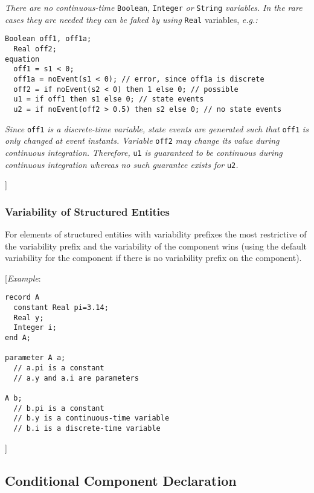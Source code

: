 \emph{There are no continuous-time} \lstinline!Boolean!, \lstinline!Integer! \emph{or} \lstinline!String!
\emph{variables.} \emph{In the rare cases they are needed they can be
faked by using} \lstinline!Real! variables, \emph{e.g.:}
\begin{lstlisting}[language=modelica]
  Boolean off1, off1a;
  Real off2;
equation
  off1 = s1 < 0;
  off1a = noEvent(s1 < 0); // error, since off1a is discrete
  off2 = if noEvent(s2 < 0) then 1 else 0; // possible
  u1 = if off1 then s1 else 0; // state events
  u2 = if noEvent(off2 > 0.5) then s2 else 0; // no state events
\end{lstlisting}

\emph{Since} \lstinline!off1! \emph{is a discrete-time variable, state events are
generated such that} \lstinline!off1! \emph{is only changed at event instants.
Variable} \lstinline!off2! \emph{may change its value during continuous integration.
Therefore,} \lstinline!u1! \emph{is guaranteed to be continuous during continuous
integration whereas no such guarantee exists for} \lstinline!u2!\emph{.}

{]}

\subsubsection{Variability of Structured Entities}

For elements of structured entities with variability prefixes the most
restrictive of the variability prefix and the variability of the
component wins (using the default variability for the component if there
is no variability prefix on the component).

{[}\emph{Example}:
\begin{lstlisting}[language=modelica]
record A
  constant Real pi=3.14;
  Real y;
  Integer i;
end A;

parameter A a;
  // a.pi is a constant
  // a.y and a.i are parameters

A b;
  // b.pi is a constant
  // b.y is a continuous-time variable
  // b.i is a discrete-time variable
\end{lstlisting}

{]}

\subsection{Conditional Component Declaration}

